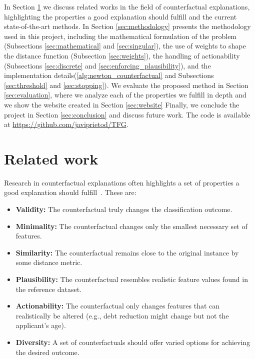 \documentclass[12pt]{extarticle}
\numberwithin{equation}{section}
\begin{document}
In Section \ref{sec:related} we discuss related works in the field of counterfactual explanations, highlighting the properties a good explanation should fulfill and the current state-of-the-art methods. In Section \ref{sec:methodology} presents the methodology used in this project, including the mathematical formulation of the problem (Subsections \ref{sec:mathematical} and \ref{sec:singular}), the use of weights to shape the distance function (Subsection \ref{sec:weights}), the handling of actionability (Subsections \ref{sec:discrete} and \ref{sec:enforcing_plausibility}), and the implementation details(\autoref{alg:newton_counterfactual} and Subsections \ref{sec:threshold} and \ref{sec:stopping}). We evaluate the proposed method in Section \ref{sec:evaluation}, where we analyze each of the properties we fulfill in depth and we show the website created in Section \ref{sec:website}
Finally, we conclude the project in Section \ref{sec:conclusion} and discuss future work. The code is available at \url{https://github.com/javiprietod/TFG}.

\section{Related work}\label{sec:related} 
Research in counterfactual explanations often highlights a set of properties a good explanation should fulfill~\cite{guidotti2024counterfactual}. These are:
\begin{itemize}
  \item \textbf{Validity:} The counterfactual truly changes the classification outcome.
  \item \textbf{Minimality:} The counterfactual changes only the smallest necessary set of features.
  \item \textbf{Similarity:} The counterfactual remains close to the original instance by some distance metric.
  \item \textbf{Plausibility:} The counterfactual resembles realistic feature values found in the reference dataset.
  \item \textbf{Actionability:} The counterfactual only changes features that can realistically be altered (e.g., debt reduction might change but not the applicant's age).
  \item \textbf{Diversity:} A set of counterfactuals should offer varied options for achieving the desired outcome.
\end{itemize}
\end{document}
